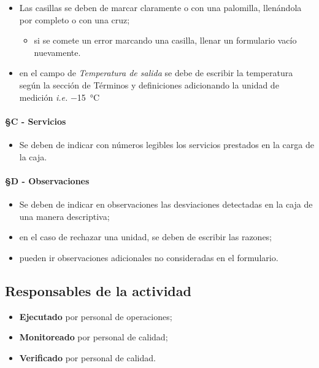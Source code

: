 \begin{itemize}
	\item Las casillas se deben de marcar claramente o con una palomilla, llenándola por completo o con una cruz;
	\begin{itemize}
		\item si se comete un error marcando una casilla, llenar un formulario vacío nuevamente.
	\end{itemize}
	\item en el campo de \emph{Temperatura de salida} se debe de escribir la temperatura según la sección de Términos y definiciones adicionando la unidad de medición \emph{i.e.} \SI{-15}{\celsius}
\end{itemize}

\paragraph{§C - Servicios}

\begin{itemize}
	\item Se deben de indicar con números legibles los servicios prestados en la carga de la caja.
\end{itemize}

\paragraph{§D - Observaciones}

\begin{itemize}
	\item Se deben de indicar en observaciones las desviaciones detectadas en la caja de una manera descriptiva;
	\item en el caso de rechazar una unidad, se deben de escribir las razones;
	\item pueden ir observaciones adicionales no consideradas en el formulario.
\end{itemize}

\subsection{Responsables de la actividad}

\begin{itemize}
	\item \textbf{Ejecutado} por personal de operaciones;
	\item \textbf{Monitoreado} por personal de calidad;
	\item \textbf{Verificado} por personal de calidad.
\end{itemize}

